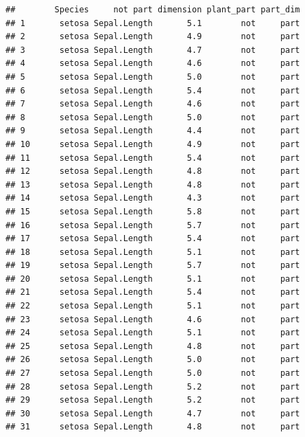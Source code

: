 \documentclass[krantz2]{krantz}\usepackage{knitr}%
\begin{document}
\begin{knitrout}\footnotesize
{}\color{fgcolor}\begin{kframe}
\begin{alltt}
 \hlkwb{<-} 
                     \hlstd{=}  \hlstd{),}
                     \hlstd{=}  \hlstd{))}
\end{alltt}
\begin{verbatim}
##        Species     not part dimension plant_part part_dim
## 1       setosa Sepal.Length       5.1        not     part
## 2       setosa Sepal.Length       4.9        not     part
## 3       setosa Sepal.Length       4.7        not     part
## 4       setosa Sepal.Length       4.6        not     part
## 5       setosa Sepal.Length       5.0        not     part
## 6       setosa Sepal.Length       5.4        not     part
## 7       setosa Sepal.Length       4.6        not     part
## 8       setosa Sepal.Length       5.0        not     part
## 9       setosa Sepal.Length       4.4        not     part
## 10      setosa Sepal.Length       4.9        not     part
## 11      setosa Sepal.Length       5.4        not     part
## 12      setosa Sepal.Length       4.8        not     part
## 13      setosa Sepal.Length       4.8        not     part
## 14      setosa Sepal.Length       4.3        not     part
## 15      setosa Sepal.Length       5.8        not     part
## 16      setosa Sepal.Length       5.7        not     part
## 17      setosa Sepal.Length       5.4        not     part
## 18      setosa Sepal.Length       5.1        not     part
## 19      setosa Sepal.Length       5.7        not     part
## 20      setosa Sepal.Length       5.1        not     part
## 21      setosa Sepal.Length       5.4        not     part
## 22      setosa Sepal.Length       5.1        not     part
## 23      setosa Sepal.Length       4.6        not     part
## 24      setosa Sepal.Length       5.1        not     part
## 25      setosa Sepal.Length       4.8        not     part
## 26      setosa Sepal.Length       5.0        not     part
## 27      setosa Sepal.Length       5.0        not     part
## 28      setosa Sepal.Length       5.2        not     part
## 29      setosa Sepal.Length       5.2        not     part
## 30      setosa Sepal.Length       4.7        not     part
## 31      setosa Sepal.Length       4.8        not     part

\end{verbatim}
\end{kframe}
\end{knitrout}
\end{document}
